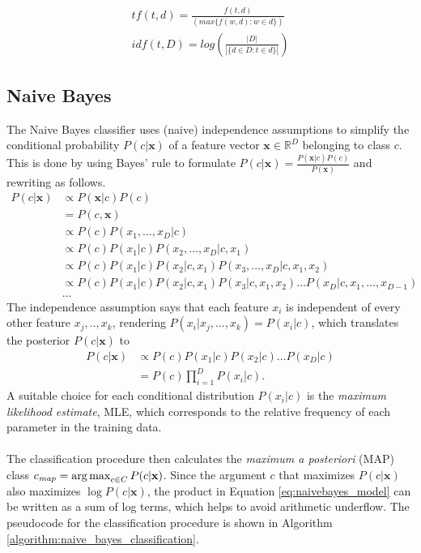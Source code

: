 \begin{equation}
\begin{array}{l}
tf(t,d) = \frac{f(t,d)}{(max \{f(w,d) : w \in d\})} \\
idf(t,D) = log(\frac{|D|}{|\{d \in D : t \in d\}|})
\end{array}
\label{eq:tfidf}
\end{equation}

\subsection{Naive Bayes}
The Naive Bayes classifier uses (naive) independence assumptions to simplify the conditional probability $P(c\vert\mathbf{x})$ of a feature vector $\mathbf{x} \in \mathbb{R}^D$ belonging to class $c$. This is done by using Bayes' rule to formulate $P(c\vert \mathbf{x}) = \frac{P(\mathbf{x}\vert c) P(c)}{P(\mathbf{x})}$ and rewriting as follows.
\begin{align*}
P(c\vert \mathbf{x}) &\propto P(\mathbf{x}\vert c)P(c)
\\&=P(c,\mathbf{x})
\\&\propto P(c) P(x_1,...,x_D\vert c)
\\&\propto P(c) P(x_1\vert c) P(x_2,...,x_D\vert c, x_1)
\\&\propto P(c) P(x_1\vert c) P(x_2\vert c, x_1) P(x_3,...,x_D\vert c,x_1,x_2)
\\&\propto P(c) P(x_1\vert c) P(x_2\vert c, x_1) P(x_3\vert c,x_1,x_2) \dots P(x_D\vert c, x_1,...,x_{D-1})
\\&\dots
\end{align*}
The independence assumption says that each feature $x_i$ is independent of every other feature $x_j,..,x_k$, rendering $P(x_i\vert x_j,...,x_k) = P(x_i\vert c)$, which translates the posterior $P(c\vert \mathbf{x})$ to
\begin{align}
P(c\vert \mathbf{x}) &\propto P(c) P(x_1\vert c) P(x_2\vert c) \dots P(x_D\vert c) \nonumber
\\&= P(c) \prod_{i=1}^{D} P(x_i\vert c).\label{eq:naivebayes_model}
\end{align}
A suitable choice for each conditional distribution $P(x_i\vert c)$ is the \textit{maximum likelihood estimate}, MLE, which corresponds to the relative frequency of each parameter in the training data.
\\\\
The classification procedure then calculates the \textit{maximum a posteriori} (MAP) class $c_{\textit{map}} = \operatorname*{arg\,max}_{c\in C} P(c\vert \mathbf{x})$. Since the argument $c$ that maximizes $P(c\vert \mathbf{x})$ also maximizes $\log P(c\vert \mathbf{x})$, the product in Equation \ref{eq:naivebayes_model} can be written as a sum of log terms, which helps to avoid arithmetic underflow. The pseudocode for the classification procedure is shown in Algorithm \ref{algorithm:naive_bayes_classification}.

